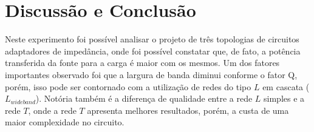 \newpage
\section{Discussão e Conclusão}
Neste experimento foi possível analisar o projeto de três topologias de circuitos adaptadores de impedância, onde foi possível constatar que, de fato, a potência transferida da fonte para a carga é maior com os mesmos.
Um dos fatores importantes observado foi que a largura de banda diminui conforme o fator Q, porém, isso pode ser contornado com a utilização de redes do tipo $L$ em cascata ($L_{wideband}$).
Notória também é a diferença de qualidade entre a rede $L$ simples e a rede $T$, onde a rede $T$ apresenta melhores resultados, porém, a custa de uma maior complexidade no circuito.